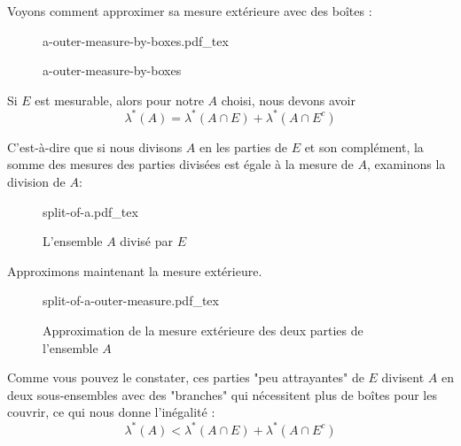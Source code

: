 \documentclass[a4paper]{article}
\newcommand{\incfig}[1]{%
    \def\svgwidth{\columnwidth}
    {#1.pdf_tex}
}
\begin{document}
Voyons comment approximer sa mesure extérieure avec des boîtes :%
\begin{figure}[H]
    \centering
    \incfig{a-outer-measure-by-boxes}
    \caption{a-outer-measure-by-boxes}
    \label{fig:a-outer-measure-by-boxes}
\end{figure}%
Si $E$ est mesurable, alors pour notre $A$ choisi, nous devons avoir
 \[
\lambda^*(A) = \lambda^*(A \cap E) + \lambda^*(A \cap E^c)
\] 

C'est-à-dire que si nous divisons $A$ en les parties de $E$ et son complément, la somme des mesures des parties divisées est égale à la mesure de $A$, examinons la division de $A$:%
\begin{figure}[H]
    \centering
    \incfig{split-of-a}
    \caption{L'ensemble $A$ divisé par $E$}
    \label{fig:split-of-a}
\end{figure}%
Approximons maintenant la mesure extérieure.%
\begin{figure}[H]
    \centering
    \incfig{split-of-a-outer-measure}
    \caption{Approximation de la mesure extérieure des deux parties de l'ensemble $A$}
    \label{fig:split-of-a-outer-measure}
\end{figure}%
Comme vous pouvez le constater, ces parties "peu attrayantes" de $E$ divisent $A$ en deux sous-ensembles avec des "branches" qui nécessitent plus de boîtes pour les couvrir, ce qui nous donne l'inégalité :
 \[
\lambda^*(A) < \lambda^*(A \cap E) + \lambda^*(A \cap E^c)
\] 
\end{document}
